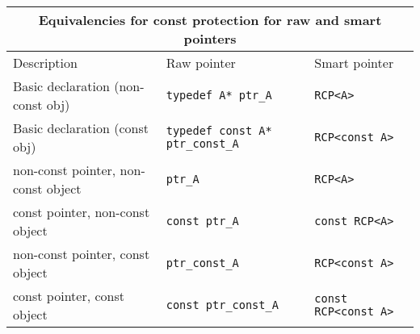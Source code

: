 \begin{tabular}{|l|l|l|}
%
\multicolumn{3}{c}{\textbf{Equivalencies for const protection for raw
  and smart pointers}} \\
\hline
Description
& Raw pointer 
& Smart pointer \\
\hline
\hline
Basic declaration (non-const obj)
& {}\texttt{typedef A* ptr\_A}
& {}\texttt{RCP<A>} \\
\hline
Basic declaration (const obj)
& {}\texttt{typedef const A* ptr\_const\_A}
& {}\texttt{RCP<const A>} \\
\hline
\hline
non-const pointer, non-const object
& {}\texttt{ptr\_A}
& {}\texttt{RCP<A>} \\
\hline
const pointer, non-const object
& {}\texttt{const ptr\_A}
& {}\texttt{const RCP<A>} \\
\hline
non-const pointer, const object
& {}\texttt{ptr\_const\_A}
& {}\texttt{RCP<const A>} \\
\hline
const pointer, const object
& {}\texttt{const ptr\_const\_A}
& {}\texttt{const RCP<const A>} \\
\hline
\end{tabular}
